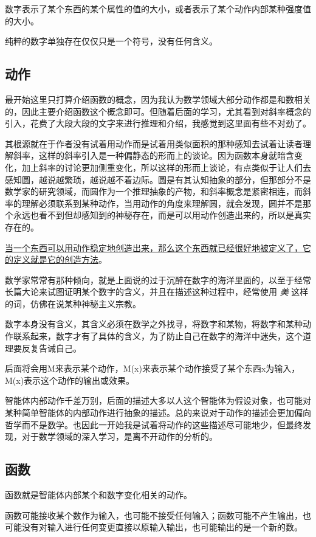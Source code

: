 \documentclass[12pt,oneside]{book}
\begin{document}
数字表示了某个东西的某个属性的值的大小，或者表示了某个动作内部某种强度值的大小。

纯粹的数字单独存在仅仅只是一个符号，没有任何含义。


\subsection{动作}
最开始这里只打算介绍函数的概念，因为我认为数学领域大部分动作都是和数相关的，因此主要介绍函数这个概念即可。但随着后面的学习，尤其看到\cite{烧掉数学书}对斜率概念的引入，花费了大段大段的文字来进行推理和介绍，我感觉到这里面有些不对劲了。

其根源就在于\cite{烧掉数学书}作者没有试着用动作而是试着用类似面积的那种感知去试着让读者理解斜率，这样的斜率引入是一种偏静态的形而上的谈论。因为函数本身就暗含变化，加上斜率的讨论更加侧重变化，所以这样的形而上谈论，有点类似于让人们去感知圆，越说越繁琐，越说越不着边际。圆是有其认知抽象的部分，但那部分不是数学家的研究领域，而圆作为一个推理抽象的产物，和斜率概念是紧密相连，而斜率的理解必须联系到某种动作，当用动作的角度来理解圆，就会发现，圆并不是那个永远也看不到但却感知到的神秘存在，而是可以用动作创造出来的，所以是真实存在的。

\uline{当一个东西可以用动作稳定地创造出来，那么这个东西就已经很好地被定义了，它的定义就是它的创造方法}。

数学家常常有那种倾向，就是上面说的过于沉醉在数字的海洋里面的，以至于经常长篇大论来试图证明某个数字的含义，并且在描述这种过程中，经常使用 \textit{美} 这样的词，仿佛在说某种神秘主义宗教。

数字本身没有含义，其含义必须在数学之外找寻，将数字和某物，将数字和某种动作联系起来，数字才有了具体的含义，为了防止自己在数字的海洋中迷失，这个道理要反复告诫自己。

后面将会用M来表示某个动作，M(x)来表示某个动作接受了某个东西x为输入，M(x)表示这个动作的输出或效果。

智能体内部动作千差万别，后面的描述大多以人这个智能体为假设对象，也可能对某种简单智能体的内部动作进行抽象的描述。总的来说对于动作的描述会更加偏向哲学而不是数学。也因此一开始我是试着将动作的这些描述尽可能地少，但最终发现，对于数学领域的深入学习，是离不开动作的分析的。


\subsection{函数}
函数就是智能体内部某个和数字变化相关的动作。

函数可能接收某个数作为输入，也可能不接受任何输入；函数可能不产生输出，也可能没有对输入进行任何变更直接以原输入输出，也可能输出的是一个新的数。
\end{document}
